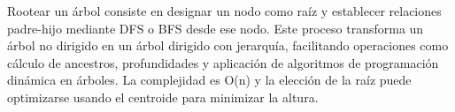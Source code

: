 \markdownRendererDocumentBegin
\markdownRendererSectionBegin
{}\markdownRendererInterblockSeparator
{}Rootear un árbol consiste en designar un nodo como raíz y establecer relaciones padre-hijo mediante DFS o BFS desde ese nodo. Este proceso transforma un árbol no dirigido en un árbol dirigido con jerarquía, facilitando operaciones como cálculo de ancestros, profundidades y aplicación de algoritmos de programación dinámica en árboles. La complejidad es \markdownRendererDollarSign{}O(n)\markdownRendererDollarSign{} y la elección de la raíz puede optimizarse usando el centroide para minimizar la altura.\markdownRendererInterblockSeparator
{}
\markdownRendererSectionEnd \markdownRendererDocumentEnd